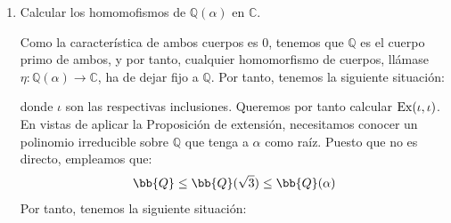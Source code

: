 \begin{ejercicio}
\begin{enumerate}
            Los únicos posibles racionales son $\pm 1$ y $\pm 3$, que no son raíces del polinomio, por lo que no hay solución en $\mathbb{Q}$, luego $\alpha\notin \mathbb{Q}\left(\sqrt{3}\right)$. Por tanto, $\left[\mathbb{Q}(\alpha):\mathbb{Q}\left(\sqrt{3}\right)\right]\neq 1$ y:
            \begin{equation*}
                \left[\mathbb{Q}(\alpha):\mathbb{Q}\left(\sqrt{3}\right)\right] = 2
            \end{equation*}
            Por tanto, $\Irr\left(\alpha,\mathbb{Q}\left(\sqrt{3}\right)\right) = x^2-1-2\sqrt{3}$.
            
        \item Calcular los homomofismos de $\mathbb{Q}(\alpha)$ en $\mathbb{C}$.
        
            Como la característica de ambos cuerpos es 0, tenemos que $\mathbb{Q}$ es el cuerpo primo de ambos, y por tanto, cualquier homomorfismo de cuerpos, llámase $\eta:\mathbb{Q}(\alpha)\to \mathbb{C}$, ha de dejar fijo a $\mathbb{Q}$. Por tanto, tenemos la siguiente situación:
            \begin{figure}[H]
                \centering
            \end{figure}
            donde $\iota$ son las respectivas inclusiones. Queremos por tanto calcular $\operatorname{Ex}(\iota,\iota)$.\\

            En vistas de aplicar la Proposición de extensión, necesitamos conocer un polinomio irreducible sobre $\mathbb{Q}$ que tenga a $\alpha$ como raíz. Puesto que no es directo, empleamos que:
            $$\bb{Q}\leq \bb{Q}(\sqrt{3})\leq \bb{Q}(\alpha)$$
            Por tanto, tenemos la siguiente situación:
            \begin{figure}[ht]
                \centering
            \end{figure}


\end{enumerate}
\end{ejercicio}
